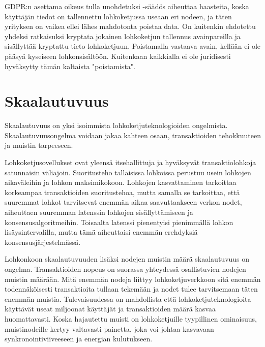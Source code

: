 \documentclass[utf8,bachelor]{gradu3}
\begin{document}
GDPR:n asettama oikeus tulla unohdetuksi -säädös aiheuttaa haasteita, koska käyttäjän tiedot on tallennettu lohkoketjussa useaan eri nodeen, ja täten yrityksen on vaikea ellei lähes mahdotonta poistaa data. On kuitenkin ehdotettu yhdeksi ratkaisuksi kryptata jokainen lohkoketjun tallennus avainpareilla ja sisällyttää kryptattu tieto lohkoketjuun. Poistamalla vastaava avain, kellään ei ole pääsyä kyseiseen lohkonsisältöön. Kuitenkaan kaikkialla ei ole juridisesti hyväksytty tämän kaltaista "poistamista". \parencite{ali2019blockchain}

\section{Skaalautuvuus}
Skaalautuvuus on yksi isoimmista lohkoketjuteknologioiden ongelmista. Skaalautuvuusongelma voidaan jakaa kahteen osaan, transaktioiden tehokkuuteen ja muistin tarpeeseen.

Lohkoketjusovellukset ovat yleensä itsehallittuja ja hyväksyvät transaktiolohkoja satunnaisin väliajoin.
Suoritusteho tallaisissa lohkoissa perustuu usein lohkojen aikaväleihin ja lohkon maksimikokoon.
Lohkojen kasvattaminen tarkoittaa korkeampaa transaktioiden suoritustehoa, mutta samalla se tarkoittaa, että suuremmat lohkot tarvitsevat enemmän aikaa saavuttaakseen verkon nodet, aiheuttaen suuremman latenssin lohkojen sisällyttämiseen ja konsensusalgoritmeihin.
Toisaalta latenssi pienentyisi pienimmällä lohkon lisäysintervalilla, mutta tämä aiheuttaisi  enemmän erehdyksiä konsensusjärjestelmässä.

Lohkonkoon skaalautuvuuden lisäksi nodejen muistin määrä skaalautuvuus on ongelma. Transaktioiden nopeus on suorassa yhteydessä osallistuvien nodejen muistin määrään.
Mitä enemmän nodeja liittyy lohkoketjuverkkoon sitä enemmän todennäköisesti transaktioita tullaan tekemään ja nodet tulee tarvitsemaan täten enemmän muistia.
Tulevaisuudessa on mahdollista että lohkoketjuteknologioita käyttävät useat miljoonat käyttäjät ja transaktioiden määrä kasvaa huomattavasti.
Koska hajautettu muisti on lohkoketjuille tyypillinen ominaisuus, muistinodeille kertyy valtavasti painetta, joka voi johtaa kasvavaan synkronointiviiveeseen ja energian kulutukseen.

\end{document}
